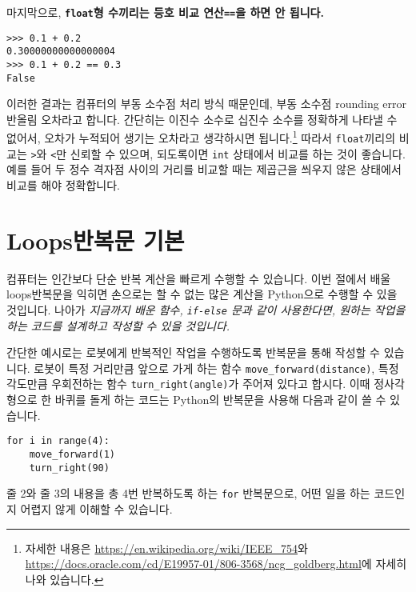 \documentclass[../main.tex]{subfiles}
\begin{document}
마지막으로, \textbf{\texttt{float}형 수끼리는 등호 비교 연산\texttt{==}을 하면 안 됩니다.}
\begin{verbatim}
>>> 0.1 + 0.2
0.30000000000000004
>>> 0.1 + 0.2 == 0.3
False
\end{verbatim}
이러한 결과는 컴퓨터의 부동 소수점 처리 방식 때문인데, 부동 소수점 rounding error반올림 오차라고 합니다.
간단히는 이진수 소수로 십진수 소수를 정확하게 나타낼 수 없어서, 오차가 누적되어 생기는 오차라고 생각하시면 됩니다.\footnote{자세한 내용은 \url{https://en.wikipedia.org/wiki/IEEE_754}와 \url{https://docs.oracle.com/cd/E19957-01/806-3568/ncg_goldberg.html}에 자세히 나와 있습니다.}
따라서 \texttt{float}끼리의 비교는 \texttt{>}와 \texttt{<}만 신뢰할 수 있으며, 되도록이면 \texttt{int} 상태에서 비교를 하는 것이 좋습니다.
예를 들어 두 정수 격자점 사이의 거리를 비교할 때는 제곱근을 씌우지 않은 상태에서 비교를 해야 정확합니다.

\section{Loops반복문 기본}
컴퓨터는 인간보다 단순 반복 계산을 빠르게 수행할 수 있습니다.
이번 절에서 배울 loops반복문을 익히면 손으로는 할 수 없는 많은 계산을 Python으로 수행할 수 있을 것입니다.
나아가 \emph{지금까지 배운 함수, \texttt{if-else} 문과 같이 사용한다면, 원하는
작업을 하는 코드를 설계하고 작성할 수 있을 것입니다.}

간단한 예시로는 로봇에게 반복적인 작업을 수행하도록 반복문을 통해 작성할 수
있습니다.
로봇이 특정 거리만큼 앞으로 가게 하는 함수 \verb|move_forward(distance)|, 특정
각도만큼 우회전하는 함수 \verb|turn_right(angle)|가 주어져 있다고 합시다.
이때 정사각형으로 한 바퀴를 돌게 하는 코드는 Python의 반복문을 사용해 다음과
같이 쓸 수 있습니다.
\begin{verbatim}
for i in range(4):
    move_forward(1)
    turn_right(90)
\end{verbatim}
줄 2와 줄 3의 내용을 총 4번 반복하도록 하는 \verb|for| 반복문으로, 어떤 일을
하는 코드인지 어렵지 않게 이해할 수 있습니다.
\end{document}
